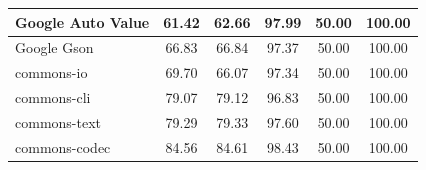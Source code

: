 \documentclass[conference,draftclsnofoot,onecolumn]{IEEEtran}
\begin{document}
\begin{table}[ht]
\begin{tabular}{|l|c|c|c|c|c|}
Google Auto Value             & 61.42                                                                                 & 62.66                                                                                     & 97.99                                                                              & 50.00                                                                               & 100.00                                                                             \\ \hline
Google Gson                   & 66.83                                                                                 & 66.84                                                                                     & 97.37                                                                              & 50.00                                                                               & 100.00                                                                             \\ \hline
commons-io                    & 69.70                                                                                 & 66.07                                                                                     & 97.34                                                                              & 50.00                                                                               & 100.00                                                                             \\ \hline
commons-cli                   & 79.07                                                                                 & 79.12                                                                                     & 96.83                                                                              & 50.00                                                                               & 100.00                                                                             \\ \hline
commons-text                  & 79.29                                                                                 & 79.33                                                                                     & 97.60                                                                              & 50.00                                                                               & 100.00                                                                             \\ \hline
commons-codec                 & 84.56                                                                                 & 84.61                                                                                     & 98.43                                                                              & 50.00                                                                               & 100.00                                                                             \\ \hline

\end{tabular}
\end{table}
\end{document}
